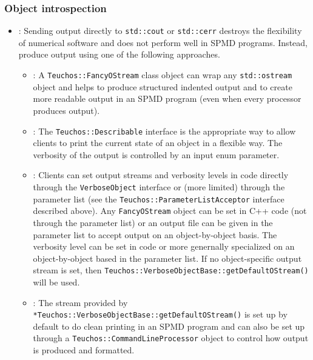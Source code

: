 %
\subsubsection{Object introspection}
%


\begin{itemize}
\item\GCGStdStream: Sending output directly to \texttt{std\-::cout} or
  \texttt{std\-::cerr} destroys the flexibility of numerical software
  and does not perform well in SPMD programs.  Instead, produce output
  using one of the following approaches.

  \begin{itemize}
  \item\GCGTeuchosFancyOStream: A \texttt{Teuchos\-::Fancy\-OStream}
    class object can wrap any \texttt{std\-::ostream} object and helps
    to produce structured indented output and to create more readable
    output in an SPMD program (even when every processor produces
    output).
  
  \item\GCGTeuchosDescribable: The \texttt{Teuchos\-::Describable}
    interface is the appropriate way to allow clients to print the
    current state of an object in a flexible way.  The verbosity of
    the output is controlled by an input enum parameter.
  
  \item\GCGTeuchosVerboseObject: Clients can set output streams and
    verbosity levels in code directly through the
    {}\texttt{VerboseObject} interface or (more limited) through the
    parameter list (see the {}\texttt{Teuchos\-::ParameterListAcceptor}
    interface described above).  Any {}\texttt{FancyOStream} object can
    be set in C++ code (not through the parameter list) or an output
    file can be given in the parameter list to accept output on an
    object-by-object basis.  The verbosity level can be set in code or
    more genernally specialized on an object-by-object based in the
    parameter list.  If no object-specific output stream is set, then
    {}\texttt{Teuchos\-::Verbose\-Object\-Base\-::get\-Default\-OStream()}
    will be used.
  
  \item\GCGTeuchosVerboseObjectBaseDefaultOStream: The stream provided
    by
    \texttt{*Teuchos\-::Verbose\-Object\-Base\-::get\-Default\-OStream()}
    is set up by default to do clean printing in an SPMD program and
    can also be set up through a
    \texttt{Teuchos\-::Command\-Line\-Processor} object to control how
    output is produced and formatted.


\end{itemize}
\end{itemize}
